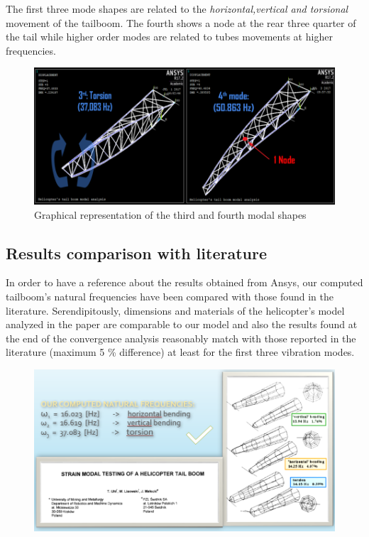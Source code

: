 \noindent
The first three mode shapes are related to the \emph{horizontal,vertical and torsional} movement of the tailboom. The fourth shows a node at the rear three quarter of the tail while higher order modes are related to tubes movements at higher frequencies. 

\begin{figure}[h]
	\begin{center}
		\centering  		 		
		\includegraphics[width=0.95\linewidth]{PICTURES/2_Lama_truss/PNG/3-4.png}
	\end{center}
	\caption {Graphical representation of the third and fourth modal shapes}
\end{figure}


\subsection*{Results comparison with literature}
\noindent
In order to have a reference about the results obtained from Ansys, our computed tailboom's natural frequencies have been compared with those found in the literature. Serendipitously, dimensions and materials of the helicopter's model analyzed in the paper are comparable to our model and also the results found at the end of the convergence analysis reasonably match with those reported in the literature (maximum 5 \% difference) at least for the first three vibration modes. \\
\begin{figure}[h]
	\begin{center}
		\centering  		 		
		\includegraphics[width=1\linewidth]{PICTURES/2_Lama_truss/PNG/comparison.png}
	\end{center}
\end{figure}

